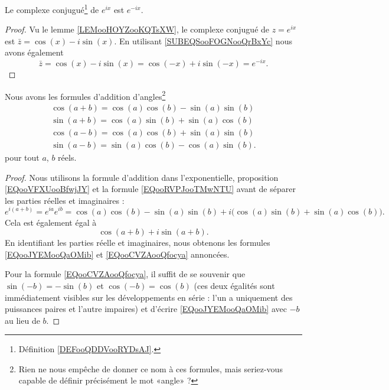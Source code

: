 \begin{corollary}       \label{CORooWZFIooDTCoRo}
	Le complexe conjugué\footnote{Définition \ref{DEFooQDDVooRYDsAJ}.} de \(  e^{ix}\) est \(  e^{-ix}\).
\end{corollary}

\begin{proof}
	Vu le lemme \ref{LEMooHOYZooKQTsXW}, le complexe conjugué de \(  z=e^{ix}\) est \(\bar z= \cos(x)-i\sin(x)\). En utilisant \eqref{SUBEQSooFOGNooQrBxYc} nous avons également
	\begin{equation}
		\bar z=\cos(x)-i\sin(x)=\cos(-x)+i\sin(-x)= e^{-ix}.
	\end{equation}
\end{proof}

\begin{lemma}       \label{LEMooJAWBooJGfZIL}
	Nous avons les formules d'addition d'angles\footnote{Rien ne nous empêche de donner ce nom à ces formules, mais seriez-vous capable de définir précisément le mot «angle» ?}
	\begin{subequations}        \label{SUBEQSooFSSMooHcYwRc}
		\begin{align}
			\cos(a+b)=\cos(a)\cos(b)-\sin(a)\sin(b) \label{EQooJYEMooQaOMib} \\
			\sin(a+b)=\cos(a)\sin(b)+\sin(a)\cos(b) \label{EQooECAUooQzckDv} \\
			\cos(a-b)=\cos(a)\cos(b)+\sin(a)\sin(b) \label{EQooCVZAooQfocya} \\
			\sin(a-b)=\sin(a)\cos(b)-\cos(a)\sin(b).
		\end{align}
	\end{subequations}
	pour tout \( a\), \( b\) réels.
\end{lemma}

\begin{proof}
	Nous utilisons la formule d'addition dans l'exponentielle, proposition \eqref{EQooVFXUooBfwjJY} et la formule \eqref{EQooRVPJooTMwNTU} avant de séparer les parties réelles et imaginaires :
	\begin{equation}
		e^{i(a+b)}= e^{ia} e^{ib}=\cos(a)\cos(b)-\sin(a)\sin(b)+i\big( \cos(a)\sin(b)+\sin(a)\cos(b) \big).
	\end{equation}
	Cela est également égal à
	\begin{equation}
		\cos(a+b)+i\sin(a+b).
	\end{equation}
	En identifiant les parties réelle et imaginaires, nous obtenons les formules \eqref{EQooJYEMooQaOMib} et \eqref{EQooCVZAooQfocya} annoncées.

	Pour la formule \eqref{EQooCVZAooQfocya}, il suffit de se souvenir que \( \sin(-b)=-\sin(b)\) et \( \cos(-b)=\cos(b)\) (ces deux égalités sont immédiatement visibles sur les développements en série : l'un a uniquement des puissances paires et l'autre impaires) et d'écrire \eqref{EQooJYEMooQaOMib} avec \( -b\) au lieu de \( b\).
\end{proof}

